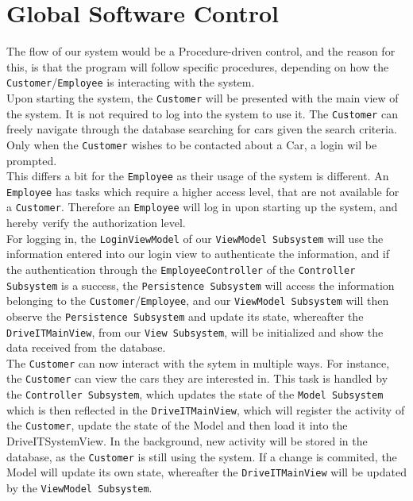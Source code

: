\section{Global Software Control}

The flow of our system would be a Procedure-driven control, and the reason for this, is that the program will follow specific procedures, depending on how the \texttt{Customer}/\texttt{Employee} is interacting with the system.\\

Upon starting the system, the \texttt{Customer} will be presented with the main view of the system. It is not required to log into the system to use it. The \texttt{Customer} can freely navigate through the database searching for cars given the search criteria. Only when the \texttt{Customer} wishes to be contacted about a Car, a login wil be prompted.\\ 

This differs a bit for the \texttt{Employee} as their usage of the system is different. An \texttt{Employee} has tasks which require a higher access level, that are not available for a \texttt{Customer}. Therefore an \texttt{Employee} will log in upon starting up the system, and hereby verify the authorization level.\\

For logging in, the \texttt{LoginViewModel} of our \texttt{ViewModel Subsystem} will use the information entered into our login view to authenticate the information, and if the authentication through the \texttt{EmployeeController} of the \texttt{Controller Subsystem} is a success, the \texttt{Persistence Subsystem} will access the information belonging to the \texttt{Customer}/\texttt{Employee}, and our \texttt{ViewModel Subsystem} will then observe the \texttt{Persistence Subsystem} and update its state, whereafter the \texttt{DriveITMainView}, from our \texttt{View Subsystem}, will be initialized and show the data received from the database.\\

The \texttt{Customer} can now interact with the sytem in multiple ways. For instance, the \texttt{Customer} can view the cars they are interested in. This task is handled by the \texttt{Controller Subsystem}, which updates the state of the \texttt{Model Subsystem} which is then reflected in the \texttt{DriveITMainView}, which will register the activity of the \texttt{Customer}, update the state of the Model and then load it into the DriveITSystemView. In the background, new activity will be stored in the database, as the \texttt{Customer} is still using the system. If a change is commited, the Model will update its own state, whereafter the \texttt{DriveITMainView} will be updated by the \texttt{ViewModel Subsystem}.\\

